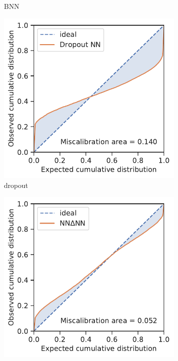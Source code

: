 \documentclass[]{achemso}
\begin{document}
\begin{figure}
\begin{subfigure}{0.32\textwidth}
        \caption{\gls{BNN}}\label{fig:calibration_bnn}
    \end{subfigure}
    \begin{subfigure}{0.32\textwidth}
        \includegraphics[width=\textwidth]{../dropout/calibration.pdf}
        \caption{\gls{dropout}}\label{fig:calibration_dropout}
    \end{subfigure}
    \begin{subfigure}{0.32\textwidth}
        \includegraphics[width=\textwidth]{../NNdNN/calibration.pdf}

\end{subfigure}
\end{figure}
\end{document}

